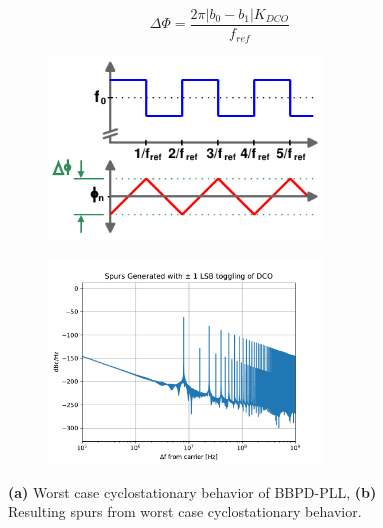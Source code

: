 		\begin{equation}\label{eq:cyclo_dph}
			\Delta \Phi = \frac{2\pi|b_0-b_1|K_{DCO}}{f_{ref}}
		\end{equation}

	\begin{figure}[htb!]
	    \centering
	    \begin{subfigure}{0.5\textwidth}
	        \centering
	        \includegraphics[width=0.8\textwidth, angle=0]{./figs/bbpd_resolution_phase_walk}
	        \caption{ }
	        \label{fig:cylostationary}
	    \end{subfigure}%
	    \begin{subfigure}{0.5\textwidth}
	        \centering
	        \center\includegraphics[width=0.8\textwidth, angle=0]{./figs/spurs_dco}
	        \caption{ }
	        \label{fig:cylostationary_spurs}
	    \end{subfigure}
	    \caption{\textbf{(a)} Worst case cyclostationary behavior of BBPD-PLL, \textbf{(b)} Resulting spurs from worst case cyclostationary behavior.}
	    \label{fig:cyclostationary_nonsense}
	\end{figure}


